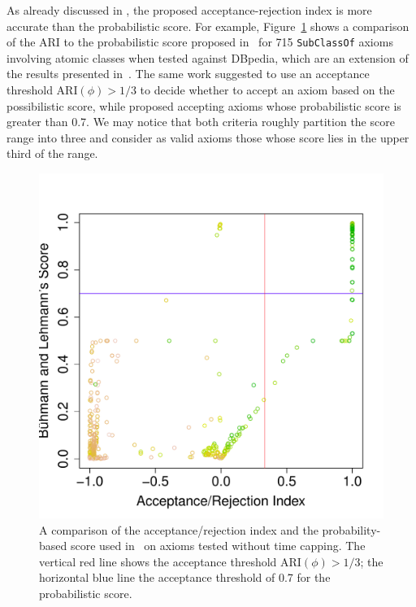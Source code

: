 \documentclass{sig-alternate}
\begin{document}
As already discussed in \cite{TettamanziFaronZuckerGandon2014ekaw}, the proposed
acceptance-rejection index is more accurate than the probabilistic score.
For example, Figure~\ref{fig:ARI-BLS} shows a comparison of the ARI
to the probabilistic score proposed in~\cite{BuehmannLehmann2012}
for 715 \texttt{SubClassOf} axioms involving atomic classes when tested against DBpedia,
which are an extension of the results presented in~\cite{TettamanziFaronZuckerGandon2014ekaw}.
The same work suggested to use an acceptance threshold $\mathrm{ARI}(\phi)>1/3$
to decide whether to accept an axiom based on the possibilistic score, while
\cite{BuehmannLehmann2012} proposed accepting axioms whose probabilistic score
is greater than 0.7. We may notice that both criteria roughly partition the score range
into three and consider as valid axioms those whose score lies in the upper third of the range.

\begin{figure}[t]
\begin{center}
  \includegraphics[height=\plotheight]{ARI-BLS}
\end{center}
\caption{A comparison of the acceptance/rejection index and the probability-based
  score used in~\cite{BuehmannLehmann2012} on axioms tested without time capping.
  The vertical red line shows the acceptance threshold $\mathrm{ARI}(\phi)>1/3$;
  the horizontal blue line the acceptance threshold of 0.7 for the probabilistic score.}
\label{fig:ARI-BLS}
\end{figure}
\end{document}
